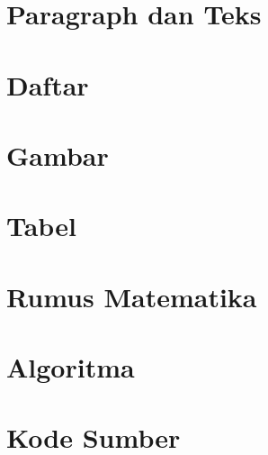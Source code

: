 \documentclass{ta-its}
\begin{document}
        \section{Paragraph dan Teks}
        \section{Daftar}
        \section{Gambar}
        \section{Tabel}
        \section{Rumus Matematika}
        \section{Algoritma}
        \section{Kode Sumber}
        

\appendix %

\backmatter %
\end{document}
